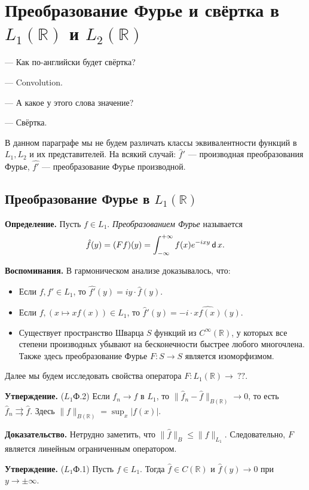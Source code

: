\section{Преобразование Фурье и свёртка в $L_1(\mathbb R)$ и $L_2(\mathbb R)$}
\epigraph{
--- Как по-английски будет свёртка?

--- Convolution.

--- А какое у этого слова значение?

--- Свёртка.
}{}
В данном параграфе мы не будем различать классы эквивалентности функций в $L_1, L_2$ и их представителей.
На всякий случай: $\hat f'$ --- производная преобразования Фурье, $\widehat{f'}$ --- преобразование Фурье производной.

\subsection{Преобразование Фурье в $L_1(\mathbb R)$}
\textbf{Определение.} Пусть $f \in L_1$.
\textit{Преобразованием Фурье} называется 
\[
    \hat f(y) = (Ff)(y) = \int_{-\infty}^{+\infty} f(x) e^{-ixy} \operatorname{\mathsf d} x.
\]

\textbf{Воспоминания.} В гармоническом анализе доказывалось, что:
\begin{itemize}
    \item Если $f, f' \in L_1$, то $\widehat{f'}(y) = iy \cdot \hat f(y)$.
    \item Если $f, (x \mapsto xf(x)) \in L_1$, то $\hat f'(y) = -i \cdot \widehat{x f(x)}(y)$.
    \item Существует пространство Шварца $S$ функций из $C^\infty(\mathbb R)$, у которых все степени производных убывают на бесконечности быстрее любого многочлена.
        Также здесь преобразование Фурье $F: S \to S$ является изоморфизмом.
\end{itemize}
Далее мы будем исследовать свойства оператора $F: L_1(\mathbb R) \to~??$.

\textbf{Утверждение.} ($L_1$Ф.2)
Если $f_n \to f$ в $L_1$, то $\|\hat f_n - \hat f\|_{B(\mathbb R)} \to 0$, то есть $\hat f_n \rightrightarrows \hat f$.
Здесь $\|f\|_{B(\mathbb R)} = \sup_x |f(x)|$.

\textbf{Доказательство.} Нетрудно заметить, что $\|\hat f\|_B \le \|f\|_{L_1}$.
Следовательно, $F$ является линейным ограниченным оператором.

\QED

\textbf{Утверждение.} ($L_1$Ф.1)
Пусть $f \in L_1$.
Тогда $\hat f \in C(\mathbb R)$ и $\hat f(y) \to 0$ при $y \to \pm \infty$.

